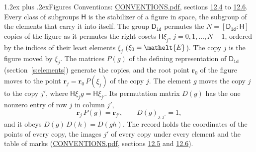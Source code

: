 \documentclass[10pt,a4paper]{article}
\makeatletter
\renewcommand\section{\@startsection{section}{1}{\z@}{-3ex plus -1ex minus -.2ex}%
  {1.2ex plus .2ex}{\normalfont\large\sffamily\bfseries\color{parttitle}}}
\numberwithin{equation}{section}
\newcommand{\eltfont}[1]{{\let\sigma\eltsigma\mathelt{#1}}}
\newcommand{\grp}[1]{\mathsf{#1}}
\newcommand{\cls}[1]{\eltfont{#1}}
\newcommand{\pointr}{\mathbf{r}}
\makeatother
\begin{document}
\section{Figures}\label{s:permutation}
Conventions: \href{../../CONVENTIONS.pdf}{CONVENTIONS.pdf}, sections \href{../../CONVENTIONS.pdf\#conv.12.4}{12.4} to \href{../../CONVENTIONS.pdf\#conv.12.6}{12.6}.
Every class of subgroups $\grp{H}$ is the stabilizer of a figure in space, the subgroup of the elements that carry it into itself. \label{n:local.orbit.size}\label{n:element.coset.least}\label{n:index.coset}The group $\grp{D_{1d}}$ permutes the $N = [\grp{D_{1d}} : \grp{H}]$ copies of the figure as it permutes the right cosets $\grp{H}\xi_j$, $j = 0, 1, \dots, N - 1$, ordered by the indices of their least elements $\xi_j$ ($\xi_0 = \cls{E}$). The copy $j$ is the figure moved by $\xi_j$. The matrices $P(g)$ of the defining representation of $\grp{D_{1d}}$ (section~\ref{s:elements}) generate the copies, and the root point $\pointr_0$ of the figure moves to the point $\pointr_j = \pointr_0\, P(\xi_j)$ of the copy $j$. \label{n:local.coset.image}The element $g$ moves the copy $j$ to the copy $j'$, where $\grp{H}\xi_j g = \grp{H}\xi_{j'}$. \label{n:local.matrix.permutation}Its permutation matrix $D(g)$ has the one nonzero entry of row $j$ in column $j'$,
\begin{equation}\label{e:perm.matrix}\pointr_j\, P(g) = \pointr_{j'}, \qquad D(g)_{j,j'} = 1,\end{equation}
and it obeys $D(g)\, D(h) = D(gh)$. The record holds the coordinates of the points of every copy, the images $j'$ of every copy under every element and the table of marks (\href{../../CONVENTIONS.pdf}{CONVENTIONS.pdf}, sections \href{../../CONVENTIONS.pdf\#conv.12.5}{12.5} and \href{../../CONVENTIONS.pdf\#conv.12.6}{12.6}).
\end{document}
